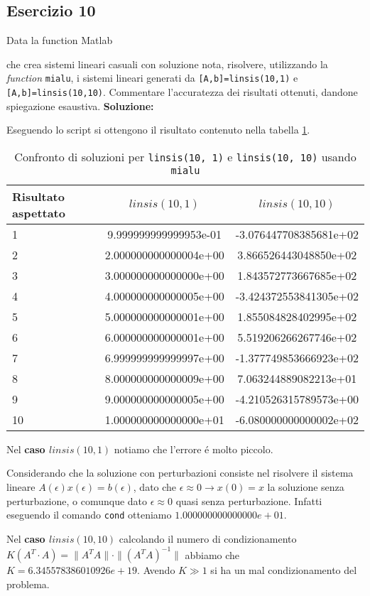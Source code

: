 \subsection{Esercizio 10}
\label{subsec:es10}
Data la function Matlab

che crea sistemi lineari casuali con soluzione nota, risolvere, utilizzando la \textit{function} \lstinline{mialu}, i sistemi
lineari generati da \lstinline{[A,b]=linsis(10,1)} e \lstinline{[A,b]=linsis(10,10)}. Commentare l'accuratezza dei
risultati ottenuti, dandone spiegazione esaustiva.
\newline \textbf{Soluzione:}

Eseguendo lo script  si ottengono il risultato contenuto nella
tabella \ref{tab:10}.

\begin{table}[ht]
  \centering
  \renewcommand\arraystretch{2}
  \begin{tabular}{|l | c c |}
    \hline
    Risultato aspettato & $linsis(10, 1)$       & $linsis(10, 10)$       \\
    \hline
    1                   & 9.999999999999953e-01 & -3.076447708385681e+02 \\
    2                   & 2.000000000000004e+00 & 3.866526443048850e+02  \\
    3                   & 3.000000000000000e+00 & 1.843572773667685e+02  \\
    4                   & 4.000000000000005e+00 & -3.424372553841305e+02 \\
    5                   & 5.000000000000001e+00 & 1.855084828402995e+02  \\
    6                   & 6.000000000000001e+00 & 5.519206266267746e+02  \\
    7                   & 6.999999999999997e+00 & -1.377749853666923e+02 \\
    8                   & 8.000000000000009e+00 & 7.063244889082213e+01  \\
    9                   & 9.000000000000005e+00 & -4.210526315789573e+00 \\
    10                  & 1.000000000000000e+01 & -6.080000000000002e+02 \\
    \hline
  \end{tabular}
  \caption{Confronto di soluzioni per \lstinline{linsis(10, 1)} e \lstinline{linsis(10, 10)} usando \lstinline{mialu}}
  \label{tab:10}
\end{table}
\FloatBarrier
Nel \textbf{caso $linsis(10, 1)$} notiamo che l'errore é molto piccolo.

Considerando che la soluzione con perturbazioni consiste nel risolvere il sistema
lineare $A(\epsilon)x(\epsilon) = b(\epsilon)$, dato che $\epsilon \approx 0 \rightarrow x(0) = x$
la soluzione senza perturbazione, o comunque dato $\epsilon \approx 0$ quasi senza perturbazione.
Infatti eseguendo il comando \lstinline{cond} otteniamo $1.000000000000000e+01$.

Nel \textbf{caso $linsis(10, 10)$} calcolando il numero di condizionamento
$K(A^T\cdot A) = \|A^T A\|\cdot\|(A^T A)^{-1}\|$ abbiamo che $K = 6.345578386010926e+19 $.
Avendo $K \gg 1$ si ha un mal condizionamento del problema.
